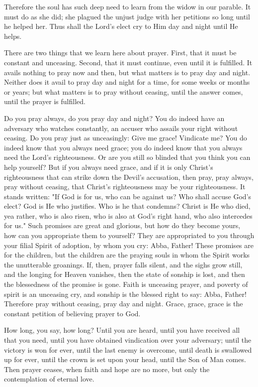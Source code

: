 Therefore the soul has such deep need to learn from the widow in our parable. It must do as she did; she plagued the unjust judge with her petitions so long until he helped her. Thus shall the Lord’s elect cry to Him day and night until He helps.

There are two things that we learn here about prayer. First, that it must be constant and unceasing. Second, that it must continue, even until it is fulfilled. It avails nothing to pray now and then, but what matters is to pray day and night. Neither does it avail to pray day and night for a time, for some weeks or months or years; but what matters is to pray without ceasing, until the answer comes, until the prayer is fulfilled.

Do you pray always, do you pray day and night? You do indeed have an adversary who watches constantly, an accuser who assails your right without ceasing. Do you pray just as unceasingly: Give me grace! Vindicate me? You do indeed know that you always need grace; you do indeed know that you always need the Lord’s righteousness. Or are you still so blinded that you think you can help yourself? But if you always need grace, and if it is only Christ’s righteousness that can strike down the Devil’s accusation, then pray, pray always, pray without ceasing, that Christ’s righteousness may be your righteousness. It stands written: "If God is for us, who can be against us? Who shall accuse God’s elect? God is He who justifies. Who is he that condemns? Christ is He who died, yea rather, who is also risen, who is also at God’s right hand, who also intercedes for us." Such promises are great and glorious, but how do they become yours, how can you appropriate them to yourself? They are appropriated to you through your filial Spirit of adoption, by whom you cry: Abba, Father! These promises are for the children, but the children are the praying souls in whom the Spirit works the unutterable groanings. If, then, prayer falls silent, and the sighs grow still, and the longing for Heaven vanishes, then the state of sonship is lost, and then the blessedness of the promise is gone. Faith is unceasing prayer, and poverty of spirit is an unceasing cry, and sonship is the blessed right to say: Abba, Father! Therefore pray without ceasing, pray day and night. Grace, grace, grace is the constant petition of believing prayer to God.

How long, you say, how long? Until you are heard, until you have received all that you need, until you have obtained vindication over your adversary; until the victory is won for ever, until the last enemy is overcome, until death is swallowed up for ever, until the crown is set upon your head, until the Son of Man comes. Then prayer ceases, when faith and hope are no more, but only the contemplation of eternal love.

